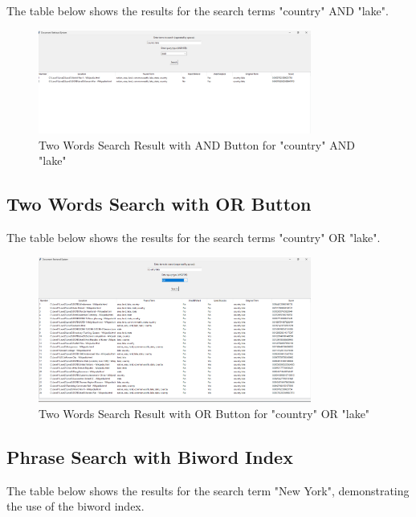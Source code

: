 \documentclass[a4paper,10pt]{article}
\begin{document}
The table below shows the results for the search terms "country" AND "lake".

\begin{figure}[H]
    \centering
    \includegraphics[width=0.8\textwidth]{and.png}
    \caption{Two Words Search Result with AND Button for "country" AND "lake"}
    \label{fig:two-words-and-search}
\end{figure}

\subsection{Two Words Search with OR Button}

The table below shows the results for the search terms "country" OR "lake".

\begin{figure}[H]
    \centering
    \includegraphics[width=0.8\textwidth]{or.png}
    \caption{Two Words Search Result with OR Button for "country" OR "lake"}
    \label{fig:two-words-or-search}
\end{figure}
\vspace{60mm}

\subsection{Phrase Search with Biword Index}

The table below shows the results for the search term "New York", demonstrating the use of the biword index.
\end{document}
